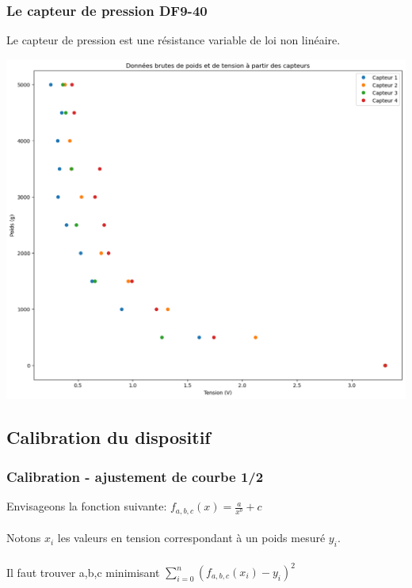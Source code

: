 \begin{frame}
    \frametitle{Le capteur de pression DF9-40}
    Le capteur de pression est une résistance variable de loi non linéaire.
    \begin{center}
        \includegraphics[scale=0.2]{./figures/cal_00.png}
    \end{center}
\end{frame}

\subsection{Calibration du dispositif}
\begin{frame}
    \frametitle{Calibration - ajustement de courbe 1/2}
    Envisageons la fonction suivante: $f_{a,b,c}(x) = \frac{a}{x^b}+c$\\
    \\
    Notons $x_i$ les valeurs en tension correspondant à un poids mesuré $y_i$.\\
    \\
    Il faut trouver a,b,c minimisant $ \sum_{i=0}^{n} (f_{a,b,c}(x_i)-y_i)^2$
\end{frame}

